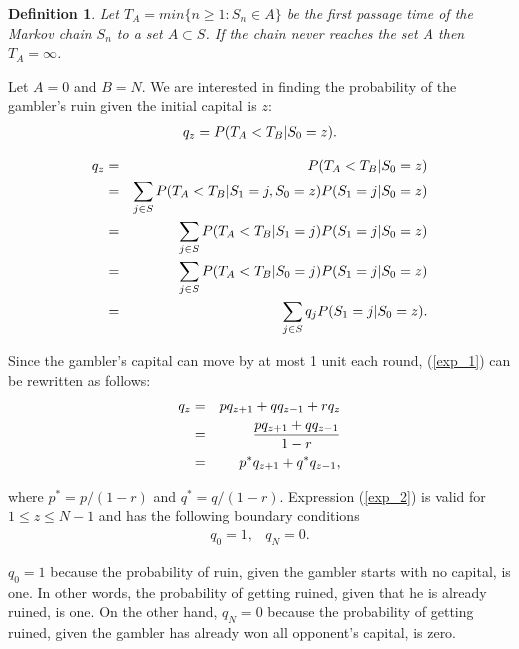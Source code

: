 \documentclass[11pt,twoside]{article}
\newtheorem{Definition}{Definition}
\numberwithin{Theorem}{section}
\numberwithin{Definition}{section}
\numberwithin{Lemma}{section}
\numberwithin{Algorithm}{section}
\numberwithin{equation}{section}
\begin{document}
\begin{Definition}Let $T_{A} = min\{n\geq 1 : S_{n}\in A\}$ be the first passage time of the Markov chain $S_{n}$ to a set $A \subset S$. If the chain never reaches the set A then $T_{A} = \infty$.  
\end{Definition}

Let $A = {0}$ and $B = {N}$. We are interested in finding the probability of the gambler’s ruin given the initial capital is $z$:
\begin{eqnarray}
    q_{z} = P(T_{A}<T_{B} \text{\textbar} S_{0}= z).
\end{eqnarray}

\begin{eqnarray}
    q_{z} &=& P(T_{A}<T_{B} \text{\textbar} S_{0}= z)\notag\\
&=& \sum_{j\in S}P(T_{A}<T_{B} \text{\textbar} S_{1} = j, S_{0}= z) P(S_{1}= j \text{\textbar} S_{0}= z)\notag\\
&=& \sum_{j\in S}P(T_{A}<T_{B} \text{\textbar} S_{1} = j) P(S_{1}= j \text{\textbar} S_{0}= z)\notag\\
&=& \sum_{j\in S}P(T_{A}<T_{B} \text{\textbar} S_{0} = j) P(S_{1}= j \text{\textbar} S_{0}= z)\notag\\
&=& \sum_{j\in S}q_{j}P(S_{1}= j \text{\textbar} S_{0}= z).\label{exp_1}  
\end{eqnarray}

Since the gambler's capital can move by at most 1 unit each round, (\ref{exp_1}) can be rewritten as follows:
\begin{eqnarray}
q_{z} &=&  p  q_{z+1}+ q q_{z-1} +  rq_{z} \notag\\
&=&  \frac{p  q_{z+1}+ q q_{z-1}}{1-r} \notag\\
&=& p^{*}  q_{z+1}+ q^{*} q_{z-1}, \label{exp_2} 
\end{eqnarray}

where $p^{*} = p/(1-r)$ and $q^{*} = q/(1-r)$. Expression (\ref{exp_2})  is valid for $1\leq z \leq N-1 $ and has the following boundary conditions 
\begin{eqnarray}
q_{0} = 1, & q_{N} = 0.
\label{exp_3} 
\end{eqnarray}

$q_{0} = 1$ because the probability of ruin, given the gambler starts with no capital, is one. In other words, the probability of getting ruined, given that he is already ruined, is one. On the other hand, $q_{N} = 0$ because the probability of getting ruined, given the gambler has already won all opponent's capital, is zero.
\end{document}
